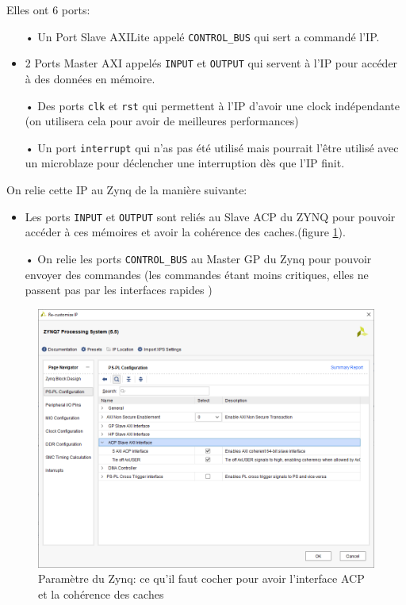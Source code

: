 \documentclass[12pt,a4paper]{article}
\begin{document}
Elles ont 6 ports: 
\begin{itemize}
	\item[•]Un Port Slave AXILite appelé \lstinline[language=bash]{CONTROL_BUS} qui sert a commandé l'IP.
	\item[•]2 Ports Master AXI appelés \lstinline[language=bash]{INPUT} et \lstinline[language=bash]{OUTPUT} qui servent à l'IP pour accéder à des données en mémoire.
	\item[•] Des ports \lstinline[language=bash]{clk} et \lstinline[language=bash]{rst} qui permettent à l'IP d'avoir une clock indépendante (on utilisera cela pour avoir de meilleures performances)
	\item[•]Un port \lstinline[language=bash]{interrupt} qui n'as pas été utilisé mais pourrait l'être utilisé avec un microblaze pour déclencher une interruption dès que l'IP finit.
	
\end{itemize}

On relie cette IP au Zynq de la manière suivante:
\begin{itemize}
	\item[•]Les ports \lstinline[language=bash]{INPUT} et \lstinline[language=bash]{OUTPUT} sont reliés au Slave ACP du ZYNQ pour pouvoir accéder à ces mémoires et avoir la cohérence des caches.(figure \ref{fig-acp}).
	\item[•] On relie les ports \lstinline[language=bash]{CONTROL_BUS} au Master GP du Zynq pour pouvoir envoyer des commandes (les commandes étant moins critiques, elles ne passent pas par les interfaces rapides )
\end{itemize}


\begin{figure}[H]
	\centering
	\includegraphics[width=\linewidth]{im/ip2.png}	
	\caption{Paramètre du Zynq: ce qu'il faut cocher pour avoir l'interface ACP et la cohérence des caches}
	\label{fig-acp}
\end{figure}
\end{document}
